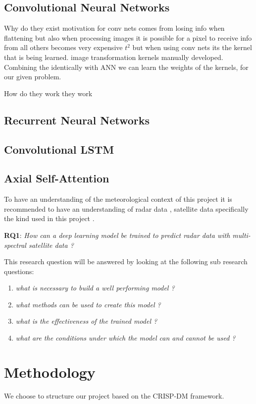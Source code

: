 \documentclass[acmtog, authorversion]{acmart}
\begin{document}
\subsection{Convolutional Neural Networks}
Why do they exist
motivation for conv nets comes from losing info when flattening but also when processing images it is possible for a pixel to
receive info from all others becomes very expensive $t^2$ but when using conv nets its the kernel that is being learned. image transformation kernels manually developed. Combining the identically
with ANN we can learn the weights of the kernels, for our given problem.

How do they work
they work

\subsection{Recurrent Neural Networks}

\subsection{Convolutional LSTM}

\subsection{Axial Self-Attention}
To have an understanding of the meteorological context of this project it is recommended to have an understanding of radar data \cite{rinehart1991radar}, satellite data specifically the kind used in this project \cite{schmid-no-date}.

\textbf{RQ1}: \textit{How can a deep learning model be trained to predict radar data with multi-spectral satellite data ?}
\smallskip

This research question will be answered by looking at the following sub research questions:
\begin{enumerate}
    \item \textit{what is necessary to build a well performing model ?}
    \item \textit{what methods can be used to create this model ?}
    \item \textit{what is the effectiveness of the trained model ?}
    \item \textit{what are the conditions under which the model can and cannot be used ?}
\end{enumerate}
\section{Methodology}
We choose to structure our project based on the CRISP-DM framework.
\end{document}
